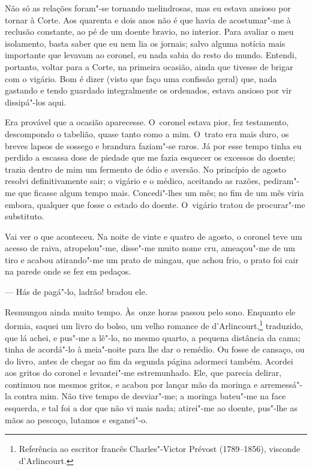 \begin{linenumbers}
Não só as relações foram"-se tornando melindrosas, mas eu estava ansioso
por tornar à Corte. Aos quarenta e dois anos não é que havia de
acostumar"-me à reclusão constante, ao pé de um doente bravio, no
interior. Para avaliar o meu isolamento, basta saber que eu nem lia os
jornais; salvo alguma notícia mais importante que levavam ao coronel, eu
nada sabia do resto do mundo. Entendi, portanto, voltar para a Corte, na
primeira ocasião, ainda que tivesse de brigar com o vigário. Bom é dizer
(visto que faço uma confissão geral) que, nada gastando e tendo guardado
integralmente os ordenados, estava ansioso por vir dissipá"-los aqui.

Era provável que a ocasião aparecesse. O~coronel estava pior, fez
testamento, descompondo o tabelião, quase tanto como a mim. O~trato era
mais duro, os breves lapsos de sossego e brandura faziam"-se raros. Já
por esse tempo tinha eu perdido a escassa dose de piedade que me fazia
esquecer os excessos do doente; trazia dentro de mim um fermento de ódio
e aversão. No princípio de agosto resolvi definitivamente sair; o
vigário e o médico, aceitando as razões, pediram"-me que ficasse algum
tempo mais. Concedi"-lhes um mês; no fim de um mês viria embora, qualquer
que fosse o estado do doente. O~vigário tratou de procurar"-me
substituto.

Vai ver o que aconteceu. Na noite de vinte e quatro de agosto, o coronel
teve um acesso de raiva, atropelou"-me, disse"-me muito nome cru,
ameaçou"-me de um tiro e acabou atirando"-me um prato de mingau, que achou
frio, o prato foi cair na parede onde se fez em pedaços.

--- Hás de pagá"-lo, ladrão! bradou ele.

Resmungou ainda muito tempo. Às~onze horas passou pelo sono. Enquanto
ele dormia, saquei um livro do bolso, um velho romance de
d'Arlincourt,\footnote{Referência ao escritor francês Charles"-Victor
  Prévost (1789--1856), visconde d'Arlincourt.} traduzido, que lá achei,
e pus"-me a lê"-lo, no mesmo quarto, a pequena distância da cama; tinha de
acordá"-lo à meia"-noite para lhe dar o remédio. Ou fosse de cansaço, ou
do livro, antes de chegar ao fim da segunda página adormeci também.
Acordei aos gritos do coronel e levantei"-me estremunhado. Ele, que
parecia delirar, continuou nos mesmos gritos, e acabou por lançar mão da
moringa e arremessá"-la contra mim. Não tive tempo de desviar"-me; a
moringa bateu"-me na face esquerda, e tal foi a dor que não vi mais nada;
atirei"-me ao doente, pus"-lhe as mãos ao pescoço, lutamos e esganei"-o.


\end{linenumbers}

